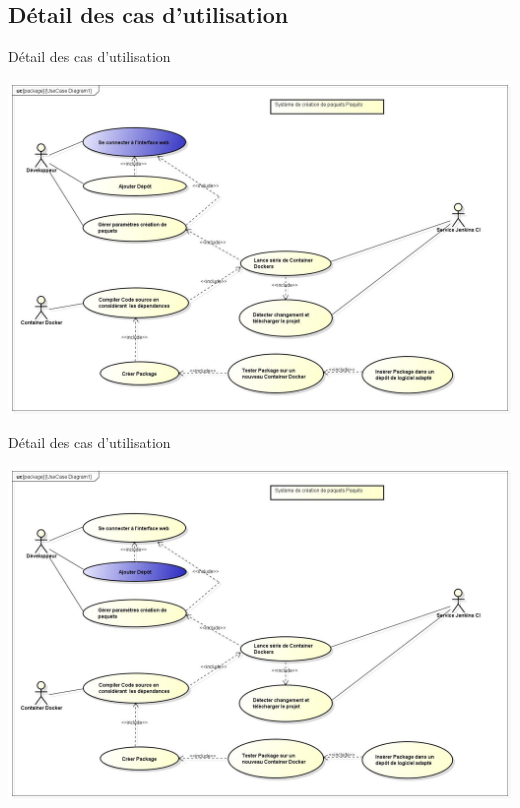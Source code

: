 \documentclass[11pt,xcolor=dvipsnames]{beamer}
\begin{document}
\subsection{Détail des cas d'utilisation}
\begin{frame}{Détail des cas d'utilisation}
	\begin{center}	
		\includegraphics[scale=\largeur]{../img/Diagram2.jpg}
	\end{center}
\end{frame}

\begin{frame}{Détail des cas d'utilisation}
	\begin{center}	
		\includegraphics[scale=\largeur]{../img/Diagram3.jpg}
	\end{center}
\end{frame}
\end{document}
